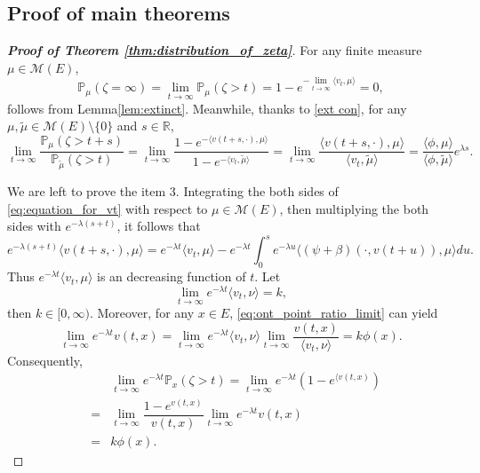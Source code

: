 \documentclass[12pt,a4paper]{amsart}
\numberwithin{equation}{section}
\theoremstyle{plain}
\theoremstyle{definition}
\begin{document}
\subsection{Proof of main theorems}
\begin{proof}[{\bf Proof of Theorem \ref{thm:distribution_of_zeta}}]
	For any finite measure $\mu\in \mathcal M(E)$,
  \[
    \mathbb P_\mu(\zeta=\infty)=\lim_{t\rightarrow\infty}\mathbb P_\mu(\zeta>t)=1-e^{-\lim_{t\rightarrow\infty}\langle v_t,\mu\rangle }=0,
  \]
	follows from Lemma\ref{lem:extinct}.
	Meanwhile, thanks to \eqref{ext con}, for any $\mu,\widetilde\mu\in \mathcal M(E)\setminus\{0\}$ and $s\in\mathbb R$,
  \[
    \lim_{t\rightarrow\infty}\frac{\mathbb P_{\mu}(\zeta>t+s)}{\mathbb P_{\widetilde\mu}(\zeta>t)}=\lim_{t\rightarrow\infty}\frac{1-e^{-\langle v(t+s,\cdot),\mu\rangle }}{1-e^{-\langle v_t,\widetilde\mu\rangle }}
    =\lim_{t\rightarrow\infty}\frac{\langle v(t+s,\cdot),\mu\rangle }{\langle v_t,\widetilde\mu\rangle }=\frac{\langle \phi,\mu\rangle }{\langle \phi,\widetilde\mu\rangle }e^{\lambda s}.
  \]

	We are left to prove the item $3$.  Integrating the both sides of \eqref{eq:equation_for_vt} with respect to $\mu\in\mathcal M(E)$, then multiplying the both sides with  $e^{-\lambda(s+t)}$, it follows that
  \begin{equation}\label{eq:ext_equ_int}
    e^{-\lambda(s+t)}\langle v(t+s,\cdot), \mu\rangle =e^{-\lambda t}\langle v_t,\mu\rangle -e^{-\lambda t}\int_0^s e^{-\lambda u}\langle (\psi+\beta)(\cdot, v(t+u)),\mu\rangle du.
  \end{equation}
	Thus $e^{-\lambda t}\langle v_t, \mu\rangle$ is an decreasing function of $t$. Let
  \begin{equation}\label{eq:def_of_k}
    \lim_{t\to\infty}e^{-\lambda t}\langle v_t, \nu\rangle=k,
  \end{equation}
 	then $k\in[0,\infty)$. Moreover, for any $x\in E$, \eqref{eq:ont_point_ratio_limit} can yield
  \[
    \lim_{t\rightarrow\infty}e^{-\lambda t}v(t,x)=\lim_{t\to\infty}e^{-\lambda t}\langle v_t,\nu\rangle \lim_{t\to\infty}\dfrac{v(t,x)}{\langle v_t,\nu\rangle }=k\phi(x).
  \]
	Consequently,
  \begin{eqnarray*}
    &&\lim_{t\rightarrow\infty}e^{-\lambda t}\mathbb P_{x}(\zeta>t)=\lim_{t\rightarrow\infty}e^{-\lambda t}\left(1-e^{\langle v(t,x)}\right)\\	
    &=&\lim_{t\rightarrow\infty}\dfrac{1-e^{ v(t,x)}}{v(t,x)}\lim_{t\to\infty}e^{-\lambda t}v(t,x)\\
    &=& k\phi(x).
  \end{eqnarray*}


\end{proof}
\end{document}

